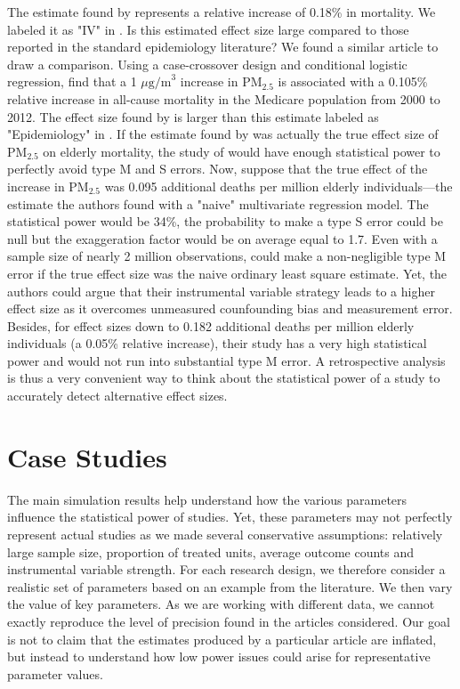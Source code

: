 \documentclass[12pt]{article}
\begin{document}
    The estimate found by \cite{deryugina_mortality_2019} represents a relative increase of 0.18\% in mortality. We labeled it as "IV" in . Is this estimated effect size large compared to those reported in the standard epidemiology literature? We found a similar article to draw a comparison. Using a case-crossover design and conditional logistic regression, \cite{di_association_2017} find that a 1 $\mu \text{g/m}^3$ increase in PM$_{2.5}$ is associated with a 0.105\% relative increase in all-cause mortality in the Medicare population from 2000 to 2012. The effect size found by \cite{deryugina_mortality_2019} is larger than this estimate labeled as "Epidemiology" in . If the estimate found by \cite{di_association_2017} was actually the true effect size of PM$_{2.5}$ on elderly mortality, the study of \cite{deryugina_mortality_2019} would have enough statistical power to perfectly avoid type M and S errors. Now, suppose that the true effect of the increase in PM$_{2.5}$ was 0.095 additional deaths per million elderly individuals---the estimate the authors found with a "naive" multivariate regression model. The statistical power would be 34\%, the probability to make a type S error could be null but the exaggeration factor would be on average equal to 1.7. Even with a sample size of nearly 2 million observations, \cite{deryugina_mortality_2019} could make a non-negligible type M error if the true effect size was the naive ordinary least square estimate. Yet, the authors could argue that their instrumental variable strategy leads to a higher effect size as it overcomes unmeasured counfounding bias and measurement error. Besides, for effect sizes down to 0.182 additional deaths per million elderly individuals (a 0.05\% relative increase), their study has a very high statistical power and would not run into substantial type M error. A retrospective analysis is thus a very convenient way to think about the statistical power of a study to accurately detect alternative effect sizes.

    \section{Case Studies}  \label{case_studies}

        The main simulation results help understand how the various parameters influence the statistical power of studies. Yet, these parameters may not perfectly represent actual studies as we made several conservative assumptions: relatively large sample size, proportion of treated units, average outcome counts and instrumental variable strength. For each research design, we therefore consider a realistic set of parameters based on an example from the literature. We then vary the value of key parameters. As we are working with different data, we cannot exactly reproduce the level of precision found in the articles considered. Our goal is not to claim that the estimates produced by a particular article are inflated, but instead to understand how low power issues could arise for representative parameter values.
            
\end{document}

